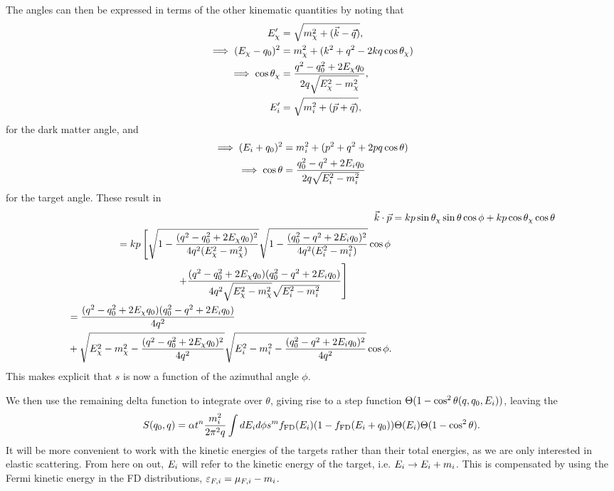 The angles can then be expressed in terms of the other kinematic quantities by noting that
\begin{align}
  E'_\chi & = \sqrt{m_\chi^2 + (\vec{k} - \vec{q})},\\
  \implies (E_\chi - q_0)^2  & = m_\chi^2 + (k^2 +q^2 -2 k q \cos\theta_\chi)\\
  \implies \cos\theta_\chi &= \frac{q^2 - q_0^2 +2 E_\chi q_0}{2 q \sqrt{E_\chi^2 - m_\chi^2}},\\
  E_i' & = \sqrt{m_i^2 + (\vec{p} + \vec{q})},\\
\end{align}
for the dark matter angle, and 
\begin{align}
  \implies (E_i + q_0)^2  & = m_i^2 + (p^2 +q^2 +2 p q \cos\theta)\\
  \implies \cos\theta &= \frac{q_0^2 - q^2 +2 E_i q_0}{2 q \sqrt{E_i^2 - m_i^2}}\label{app:eq:cosn}
\end{align}
for the target angle.
These result in
\begin{align}
    \vec{k}\cdot \vec{p} & = kp\sin\theta_\chi\sin\theta\cos\phi + k p \cos\theta_\chi \cos\theta\\
    \begin{split}
        & = kp\left[ \sqrt{1  - \frac{(q^2 - q_0^2 +2 E_\chi q_0)^2}{4 q^2 (E_\chi^2 - m_\chi^2)}}\sqrt{1 - \frac{(q_0^2 - q^2 +2 E_i q_0)^2}{4 q^2 (E_i^2 - m_i^2)}}\cos\phi \right. \\
        &\hspace{6em} \left. + \frac{(q^2 - q_0^2 + 2E_\chi q_0)(q_0^2 - q^2 +2 E_i q_0)}{4 q^2 \sqrt{E_\chi^2 -m_\chi^2}\sqrt{E_i^2 -m_i^2}} \right]
    \end{split}\\
    \begin{split}
        & = \frac{(q^2 - q_0^2 + 2E_\chi q_0)(q_0^2 - q^2 +2 E_i q_0)}{4 q^2}\\ 
        &+ \sqrt{E_\chi^2 - m_\chi^2  - \frac{(q^2 - q_0^2 +2 E_\chi q_0)^2}{4 q^2 }}\sqrt{E_i^2 - m_i^2 - \frac{(q_0^2 - q^2 +2 E_i q_0)^2}{4 q^2 }}\cos\phi.
    \end{split}
\end{align}
This makes explicit that $s$ is now a function of the azimuthal angle $\phi$. 

We then use the remaining delta function to integrate over $\theta$, giving rise to a step function $ \Theta(1-\cos^2\theta(q,q_0,E_i))$, leaving the 
\begin{equation}
S(q_0,q) = \alpha t^n \frac{m_i^2}{2\pi^2 q}\int dE_i d\phi s^m  f_{\rm FD}(E_i)(1-f_{\rm FD}(E_i+q_0))\Theta(E_i)  \Theta(1-\cos^2\theta).
\end{equation}
It will be more convenient to work with the kinetic energies of the targets rather than their total energies, as we are only interested in elastic scattering. From here on out, $E_i$ will refer to the kinetic energy of the target, i.e. $E_i\rightarrow E_i + m_i$. This is compensated by using the Fermi kinetic energy in the FD distributions, $\varepsilon_{F,i} = \mu_{F,i} - m_i$.

